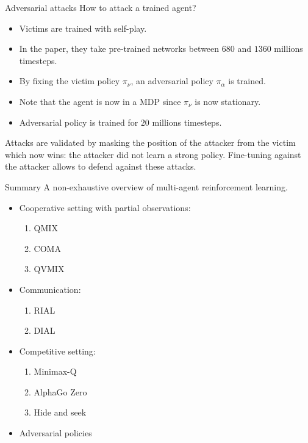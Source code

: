 \documentclass{beamer}
\begin{document}
\begin{frame}{Adversarial attacks}
How to attack a trained agent?
\begin{itemize}
    \item Victims are trained with self-play.
    \item In the paper, they take pre-trained networks between $680$ and $1360$ millions timesteps.
    \item By fixing the victim policy $\pi_\nu$, an adversarial policy $\pi_\alpha$ is trained.
    \item Note that the agent is now in a MDP since $\pi_\nu$ is now stationary.
    \item Adversarial policy is trained for $20$ millions timesteps.
\end{itemize}
\vfill
Attacks are validated by masking the position of the attacker from the victim which now wins: the attacker did not learn a strong policy.
\vfill
Fine-tuning against the attacker allows to defend against these attacks.
\end{frame}

\begin{frame}{Summary}
A non-exhaustive overview of multi-agent reinforcement learning.
\begin{itemize}
    \item Cooperative setting with partial observations:
    \begin{enumerate}
        \item QMIX
        \item COMA
        \item QVMIX
    \end{enumerate}
    \item Communication:
    \begin{enumerate}
        \item RIAL
        \item DIAL
    \end{enumerate}
    \item Competitive setting:
    \begin{enumerate}
        \item Minimax-Q
        \item AlphaGo Zero
        \item Hide and seek
    \end{enumerate}
    \item Adversarial policies
\end{itemize}
\end{frame}
\end{document}
